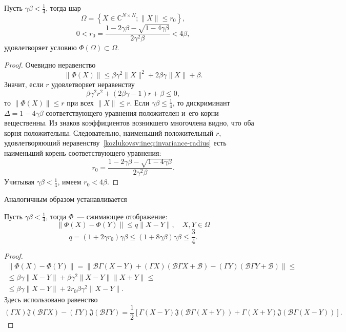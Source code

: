 \begin{ksvlem}
    Пусть \( \gamma\beta < \frac14\),
    тогда шар
    \[
        \Omega = \left\{ X\in \mathbb{C}^{N{\times}N}; \|X\| \leq r_0 \right\}, \]
    \[  0 < r_0 = \frac{1 - 2\gamma\beta - \sqrt{1-4\gamma\beta}}{2\gamma^2\beta} < 4\beta, \]
    удовлетворяет условию \( \Phi(\Omega)\subset\Omega \).
\end{ksvlem}
\begin{proof}
Очевидно неравенство
    \[ \| \Phi(X) \| \leq
     \beta \gamma^2 \|X\|^2 + 2\beta\gamma\|X\| + \beta. \]
Значит, если \( r \) удовлетворяет неравенству
    \begin{equation}\label{kozlukovsv:ineq:invariance-radius}
        \beta \gamma^2 r^2 + (2\beta\gamma - 1)r + \beta \leq 0,
    \end{equation}
    то \( \|\Phi(X)\| \leq r \) при всех \( \|X\| \leq r \).
Если \( \gamma\beta \leq \frac14 \),
    то дискриминант \( \Delta = 1-4\gamma\beta \)
    соответствующего уравнения положителен и~его корни вещественны.
Из знаков коэффициентов возникшего многочлена видно, что оба корня положительны.
Следовательно, наименьший положительный \( r \),
    удовлетворяющий неравенству~\eqref{kozlukovsv:ineq:invariance-radius}
    есть наименьший корень
    соответствующего уравнения:
    \[ r_0 = \frac{1 - 2\gamma\beta - \sqrt{1-4\gamma\beta}}{2\gamma^2\beta}. \]
Учитывая \( \gamma\beta<\frac14 \), имеем \( r_0 < 4\beta \).
\end{proof}

Аналогичным образом устанавливается
\begin{ksvlem}
    Пусть \(\gamma\beta<\frac14\),
    тогда \( \Phi \)~--- сжимающее отображение:
    \[ \| \Phi(X) - \Phi(Y) \| \leq q \|X - Y\|, \quad X,Y\in\Omega \]
    \[ q = (1+2\gamma r_0) \gamma\beta \leq (1+8\gamma\beta)\gamma\beta \leq \frac34. \]
\end{ksvlem}
\begin{proof}
    \begin{align*} \| \Phi(X) - \Phi(Y) \| = \| \mathcal{B}\Gamma (X-Y) + (\Gamma X)(\mathcal{B}\Gamma X + \mathcal{B})
     - (\Gamma Y)(\mathcal{B} \Gamma Y + \mathcal{B}) \| \leq \\
        \leq
     \beta\gamma\|X-Y\| +
     \beta \gamma^2 \|X-Y\| \|X+Y\| \leq \\
        \leq
     \beta\gamma\|X-Y\| +
     2 r_0 \beta \gamma^2 \|X-Y\|.
    \end{align*}
Здесь использовано равенство
\[ (\Gamma X) \mathfrak{J}(\mathcal{B}\Gamma X) - (\Gamma Y) \mathfrak{J}(\mathcal{B}\Gamma Y) =
    \frac12\left[
        \Gamma(X-Y) \mathfrak{J}(\mathcal{B}\Gamma(X+Y))
    +   \Gamma(X+Y) \mathfrak{J}(\mathcal{B}\Gamma(X-Y))
    \right]. \]
\end{proof}

